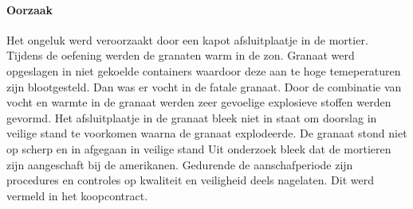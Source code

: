 \documentclass{article}
\begin{document}
	\paragraph{Oorzaak}
	Het ongeluk werd veroorzaakt door een kapot afsluitplaatje in de mortier.    Tijdens de oefening werden de granaten warm in de zon. 
	Granaat werd opgeslagen in niet  gekoelde containers waardoor deze aan te hoge temeperaturen zijn blootgesteld.  Dan was er vocht in de fatale granaat.
	Door de combinatie van vocht en warmte in de granaat werden zeer gevoelige explosieve stoffen werden gevormd.
	Het afsluitplaatje in de granaat bleek niet in staat om doorslag in veilige stand te voorkomen waarna de granaat explodeerde.
	De granaat stond niet op scherp en in afgegaan in veilige stand
	Uit onderzoek bleek dat de  mortieren zijn aangeschaft bij de amerikanen. Gedurende de aanschafperiode zijn procedures en controles op kwaliteit en veiligheid deels nagelaten.
	Dit  werd vermeld in het koopcontract.
	

	
\end{document}
